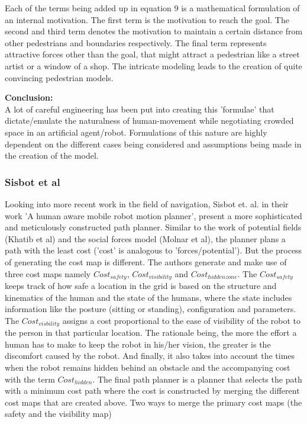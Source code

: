 Each of the terms being added up in equation 9 is a mathematical formulation of an internal motivation.
The first term is the motivation to reach the goal.
The second and third term denotes the motivation to maintain a certain distance from other pedestrians and boundaries respectively.
The final term represents attractive forces other than the goal, that might attract a pedestrian like a street artist or a window of a shop.
The intricate modeling leads to the creation of quite convincing pedestrian models. 
\par
\textbf{Conclusion:}\\
A lot of careful engineering has been put into creating this 'formulae' that dictate/emulate the naturalness of human-movement while negotiating crowded space in an artificial agent/robot. 
Formulations of this nature are highly dependent on the different cases being considered and assumptions being made in the creation of the model. 
\subsubsection*{Sisbot et al}
Looking into more recent work in the field of navigation,
Sisbot et. al. in their work 'A human aware mobile robot motion planner', present a more sophisticated and meticulously constructed path planner. Similar to the work of potential fields (Khatib et al) and the social forces model (Molnar et al), the planner plans a path with the least cost ('cost' is analogous to 'forces/potential'). But the process of generating the cost map is different.
The authors generate and make use of three cost maps namely $Cost_{safety}$, $Cost_{visibility}$ and $Cost_{hidden zone}$.
The $Cost_{safety}$ keeps track of how safe a location in the grid is based on the structure and kinematics of the human and the state of the humans, where the state includes information like the posture (sitting or standing), configuration and parameters.
The $Cost_{visbility}$ assigns a cost proportional to the ease of visibility of the robot to the person in that particular location. The rationale being, the more the effort a human has to make to keep the robot in his/her vision, the greater is the discomfort caused by the robot.
And finally, it also takes into account the times when the robot remains hidden behind an obstacle and the accompanying cost with the term $Cost_{hidden}$. 
The final path planner is a planner that selects the path with a minimum cost path where the cost is constructed by merging the different cost maps that are created above.
Two ways to merge the primary cost maps (the safety and the visibility map)

